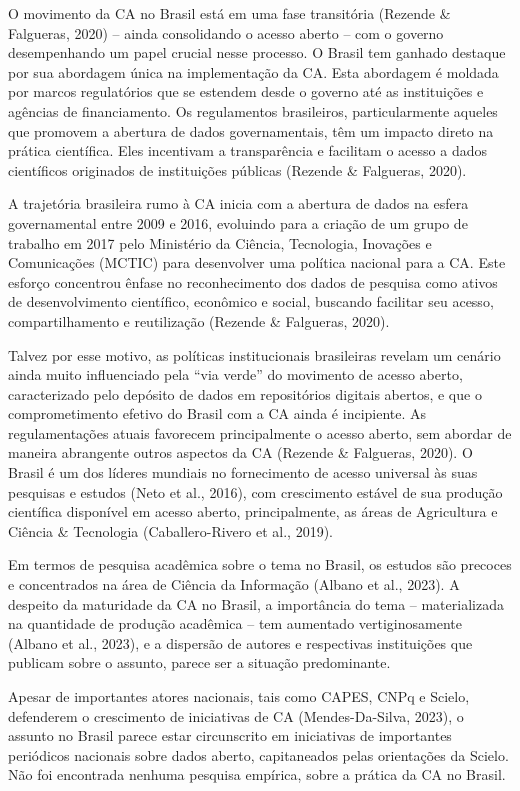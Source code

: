 \documentclass[
  a4paper,
]{book}
\begin{document}
O movimento da CA no Brasil está em uma fase transitória (Rezende \&
Falgueras, 2020) -- ainda consolidando o acesso aberto -- com o governo
desempenhando um papel crucial nesse processo. O Brasil tem ganhado
destaque por sua abordagem única na implementação da CA. Esta abordagem
é moldada por marcos regulatórios que se estendem desde o governo até as
instituições e agências de financiamento. Os regulamentos brasileiros,
particularmente aqueles que promovem a abertura de dados governamentais,
têm um impacto direto na prática científica. Eles incentivam a
transparência e facilitam o acesso a dados científicos originados de
instituições públicas (Rezende \& Falgueras, 2020).

A trajetória brasileira rumo à CA inicia com a abertura de dados na
esfera governamental entre 2009 e 2016, evoluindo para a criação de um
grupo de trabalho em 2017 pelo Ministério da Ciência, Tecnologia,
Inovações e Comunicações (MCTIC) para desenvolver uma política nacional
para a CA. Este esforço concentrou ênfase no reconhecimento dos dados de
pesquisa como ativos de desenvolvimento científico, econômico e social,
buscando facilitar seu acesso, compartilhamento e reutilização (Rezende
\& Falgueras, 2020).

Talvez por esse motivo, as políticas institucionais brasileiras revelam
um cenário ainda muito influenciado pela ``via verde'' do movimento de
acesso aberto, caracterizado pelo depósito de dados em repositórios
digitais abertos, e que o comprometimento efetivo do Brasil com a CA
ainda é incipiente. As regulamentações atuais favorecem principalmente o
acesso aberto, sem abordar de maneira abrangente outros aspectos da CA
(Rezende \& Falgueras, 2020). O Brasil é um dos líderes mundiais no
fornecimento de acesso universal às suas pesquisas e estudos (Neto et
al., 2016), com crescimento estável de sua produção científica
disponível em acesso aberto, principalmente, as áreas de Agricultura e
Ciência \& Tecnologia (Caballero-Rivero et al., 2019).

Em termos de pesquisa acadêmica sobre o tema no Brasil, os estudos são
precoces e concentrados na área de Ciência da Informação (Albano et al.,
2023). A despeito da maturidade da CA no Brasil, a importância do tema
-- materializada na quantidade de produção acadêmica -- tem aumentado
vertiginosamente (Albano et al., 2023), e a dispersão de autores e
respectivas instituições que publicam sobre o assunto, parece ser a
situação predominante.

Apesar de importantes atores nacionais, tais como CAPES, CNPq e Scielo,
defenderem o crescimento de iniciativas de CA (Mendes-Da-Silva, 2023), o
assunto no Brasil parece estar circunscrito em iniciativas de
importantes periódicos nacionais sobre dados aberto, capitaneados pelas
orientações da Scielo. Não foi encontrada nenhuma pesquisa empírica,
sobre a prática da CA no Brasil.
\end{document}
